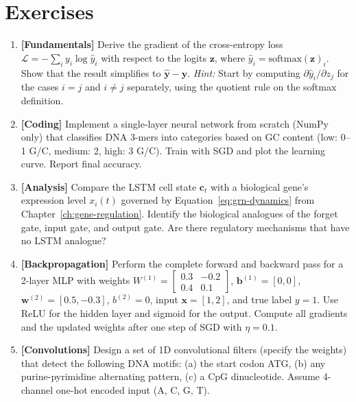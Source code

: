 \section{Exercises}
\label{sec:ch4-exercises}

\begin{enumerate}[label=\textbf{4.\arabic*.}, leftmargin=2.5em]

\item \textbf{[Fundamentals]} Derive the gradient of the cross-entropy loss $\mathcal{L} = -\sum_i y_i \log \hat{y}_i$ with respect to the logits $\mathbf{z}$, where $\hat{y}_i = \text{softmax}(\mathbf{z})_i$. Show that the result simplifies to $\hat{\mathbf{y}} - \mathbf{y}$. \emph{Hint:} Start by computing $\partial \hat{y}_i / \partial z_j$ for the cases $i = j$ and $i \neq j$ separately, using the quotient rule on the softmax definition.

\item \textbf{[Coding]} Implement a single-layer neural network from scratch (NumPy only) that classifies DNA 3-mers into categories based on GC content (low: 0--1 G/C, medium: 2, high: 3 G/C). Train with SGD and plot the learning curve. Report final accuracy.

\item \textbf{[Analysis]} Compare the LSTM cell state $\mathbf{c}_t$ with a biological gene's expression level $x_i(t)$ governed by Equation~\ref{eq:grn-dynamics} from Chapter~\ref{ch:gene-regulation}. Identify the biological analogues of the forget gate, input gate, and output gate. Are there regulatory mechanisms that have no LSTM analogue?

\item \textbf{[Backpropagation]} Perform the complete forward and backward pass for a 2-layer MLP with weights $W^{(1)} = \begin{bmatrix} 0.3 & -0.2 \\ 0.4 & 0.1 \end{bmatrix}$, $\mathbf{b}^{(1)} = [0, 0]$, $\mathbf{w}^{(2)} = [0.5, -0.3]$, $b^{(2)} = 0$, input $\mathbf{x} = [1, 2]$, and true label $y = 1$. Use ReLU for the hidden layer and sigmoid for the output. Compute all gradients and the updated weights after one step of SGD with $\eta = 0.1$.

\item \textbf{[Convolutions]} Design a set of 1D convolutional filters (specify the weights) that detect the following DNA motifs: (a) the start codon ATG, (b) any purine-pyrimidine alternating pattern, (c) a CpG dinucleotide. Assume 4-channel one-hot encoded input (A, C, G, T).


\end{enumerate}
